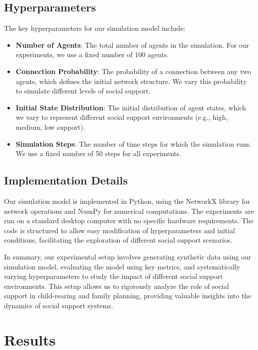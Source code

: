 \documentclass{article} %
\begin{document}
\subsection{Hyperparameters}
\label{sec:hyperparameters}
The key hyperparameters for our simulation model include:
\begin{itemize}
    \item \textbf{Number of Agents}: The total number of agents in the simulation. For our experiments, we use a fixed number of 100 agents.
    \item \textbf{Connection Probability}: The probability of a connection between any two agents, which defines the initial network structure. We vary this probability to simulate different levels of social support.
    \item \textbf{Initial State Distribution}: The initial distribution of agent states, which we vary to represent different social support environments (e.g., high, medium, low support).
    \item \textbf{Simulation Steps}: The number of time steps for which the simulation runs. We use a fixed number of 50 steps for all experiments.
\end{itemize}

\subsection{Implementation Details}
\label{sec:implementation_details}
Our simulation model is implemented in Python, using the NetworkX library for network operations and NumPy for numerical computations. The experiments are run on a standard desktop computer with no specific hardware requirements. The code is structured to allow easy modification of hyperparameters and initial conditions, facilitating the exploration of different social support scenarios.

In summary, our experimental setup involves generating synthetic data using our simulation model, evaluating the model using key metrics, and systematically varying hyperparameters to study the impact of different social support environments. This setup allows us to rigorously analyze the role of social support in child-rearing and family planning, providing valuable insights into the dynamics of social support systems.


\section{Results}
\label{sec:results}
\end{document}
